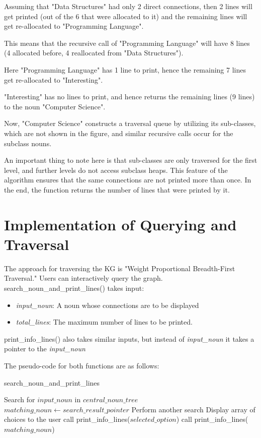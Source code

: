 \documentclass[conference]{IEEEtran}
\begin{document}
Assuming that "Data Structures" had only 2 direct connections, then 2 lines will get printed (out of the 6 that were allocated to it) and the remaining lines will get re-allocated to "Programming Language".

This means that the recursive call of "Programming Language" will have 8 lines (4 allocated before, 4 reallocated from "Data Structures").

Here "Programming Language" has 1 line to print, hence the remaining 7 lines get re-allocated to "Interesting".

"Interesting" has no lines to print, and hence returns the remaining lines (9 lines) to the noun "Computer Science".

Now, "Computer Science" constructs a traversal queue by utilizing its sub-classes, which are not shown in the figure, and similar recursive calls occur for the subclass nouns.

An important thing to note here is that sub-classes are only traversed for the first level, and further levels do not access subclass heaps. This feature of the algorithm ensures that the same connections are not printed more than once.
In the end, the function returns the number of lines that were printed by it.



\section{Implementation of Querying and Traversal}

The approach for traversing the KG is "Weight Proportional Breadth-First Traversal." Users can interactively query the graph.\\
search\_noun\_and\_print\_lines() takes input: 
\begin{itemize}
\item \textit{input\_noun}: A noun whose connections are to be displayed
\item \textit{total\_lines}: The maximum number of lines to be printed. 
\end{itemize}
print\_info\_lines() also takes similar inputs, but instead of \textit{input\_noun} it takes a pointer to the \textit{input\_noun}


The pseudo-code for both functions are as follows:


\begin{algorithm}
\caption{search\_noun\_and\_print\_lines}
\begin{algorithmic}[1]
    \State Search for $input\_noun$ in $central\_noun\_tree$
    \State $matching\_noun \gets search\_result\_pointer$
        \State Perform another search
        \State Display array of choices to the user
            \State call print\_info\_lines($selected\_option$)
        \EndFor
    \Else
        \State call print\_info\_lines($matching\_noun$)
    \EndIf
\EndProcedure
\end{algorithmic}
\end{algorithm}
\end{document}
